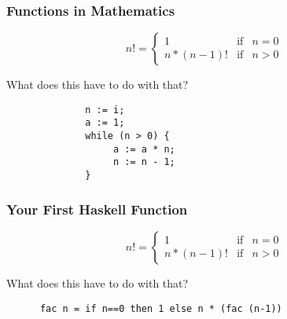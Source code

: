 \documentclass{beamer}
\begin{document}
\begin{frame}[fragile]
    \frametitle{Functions in Mathematics}
    

\begin{displaymath}
n! = \left\{
     \begin{array}{lcl}
     1 &\mbox{if} & n=0
\\
     n * (n-1)!&\mbox{if} & n > 0
     \end{array}\right.
\end{displaymath}
\pause

What does this have to do with that? 
\begin{verbatim}
              n := i; 
              a := 1; 
              while (n > 0) { 
                   a := a * n; 
                   n := n - 1; 
              }
\end{verbatim}

\end{frame}

\begin{frame}[fragile]
    \frametitle{Your First Haskell Function}
    

\begin{displaymath}
n! = \left\{
     \begin{array}{lcl}
     1 &\mbox{if} & n=0
\\
     n * (n-1)!&\mbox{if} & n > 0
     \end{array}\right.
\end{displaymath}
\pause

What does this have to do with that? 
\begin{verbatim}
      fac n = if n==0 then 1 else n * (fac (n-1))
\end{verbatim}

\end{frame}
\end{document}
